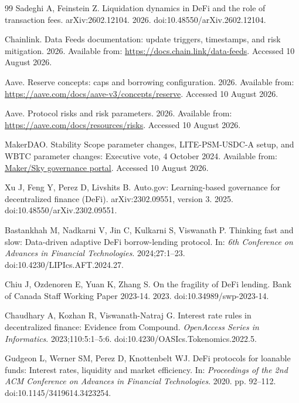 \documentclass[sn-vancouver,Numbered]{sn-jnl}
\begin{document}
\begin{thebibliography}{99}
Sadeghi A, Feinstein Z.
Liquidation dynamics in DeFi and the role of transaction fees.
arXiv:2602.12104. 2026.
doi:10.48550/arXiv.2602.12104.

Chainlink.
Data Feeds documentation: update triggers, timestamps, and risk mitigation.
2026. Available from: \url{https://docs.chain.link/data-feeds}. Accessed 10 August 2026.

Aave.
Reserve concepts: caps and borrowing configuration.
2026. Available from: \url{https://aave.com/docs/aave-v3/concepts/reserve}. Accessed 10 August 2026.

Aave.
Protocol risks and risk parameters.
2026. Available from: \url{https://aave.com/docs/resources/risks}. Accessed 10 August 2026.

MakerDAO.
Stability Scope parameter changes, LITE-PSM-USDC-A setup, and WBTC parameter changes: Executive vote, 4 October 2024.
Available from: \href{https://vote.makerdao.com/executive/template-executive-vote-stability-scope-parameter-changes-lite-psm-usdc-a-phase-3-final-setup-aave-lido-market-spark-usds-ddm-activation-wbtc-legacy-vaults-parameter-changes-october-4-2024}{Maker/Sky governance portal}. Accessed 10 August 2026.

Xu J, Feng Y, Perez D, Livshits B.
Auto.gov: Learning-based governance for decentralized finance (DeFi).
arXiv:2302.09551, version 3. 2025.
doi:10.48550/arXiv.2302.09551.

Bastankhah M, Nadkarni V, Jin C, Kulkarni S, Viswanath P.
Thinking fast and slow: Data-driven adaptive DeFi borrow-lending protocol.
In: \textit{6th Conference on Advances in Financial Technologies}. 2024;27:1--23.
doi:10.4230/LIPIcs.AFT.2024.27.

Chiu J, Ozdenoren E, Yuan K, Zhang S.
On the fragility of DeFi lending.
Bank of Canada Staff Working Paper 2023-14. 2023.
doi:10.34989/swp-2023-14.

Chaudhary A, Kozhan R, Viswanath-Natraj G.
Interest rate rules in decentralized finance: Evidence from Compound.
\textit{OpenAccess Series in Informatics}. 2023;110:5:1--5:6.
doi:10.4230/OASIcs.Tokenomics.2022.5.

Gudgeon L, Werner SM, Perez D, Knottenbelt WJ.
DeFi protocols for loanable funds: Interest rates, liquidity and market efficiency.
In: \textit{Proceedings of the 2nd ACM Conference on Advances in Financial Technologies}. 2020. pp. 92--112.
doi:10.1145/3419614.3423254.


\end{thebibliography}
\end{document}
